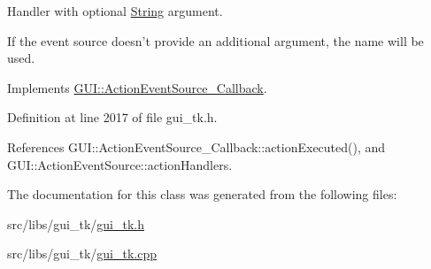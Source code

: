 Handler with optional \hyperlink{classGUI_1_1String}{String} argument. 

If the event source doesn't provide an additional argument, the name will be used. 

Implements \hyperlink{structGUI_1_1ActionEventSource__Callback_a36df23a424558a83b45e3e3d5c175cf2}{G\-U\-I\-::\-Action\-Event\-Source\-\_\-\-Callback}.



Definition at line 2017 of file gui\-\_\-tk.\-h.



References G\-U\-I\-::\-Action\-Event\-Source\-\_\-\-Callback\-::action\-Executed(), and G\-U\-I\-::\-Action\-Event\-Source\-::action\-Handlers.



The documentation for this class was generated from the following files\-:\begin{DoxyCompactItemize}
\item 
src/libs/gui\-\_\-tk/\hyperlink{gui__tk_8h}{gui\-\_\-tk.\-h}\item 
src/libs/gui\-\_\-tk/\hyperlink{gui__tk_8cpp}{gui\-\_\-tk.\-cpp}\end{DoxyCompactItemize}
